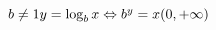
$
\vspace{5mm} b \neq 1 \\ \\
\vspace{5mm} y = \log_{b}x \Leftrightarrow b^{y} = x \\
\vspace{5mm} (0, +\infty) \\
$
